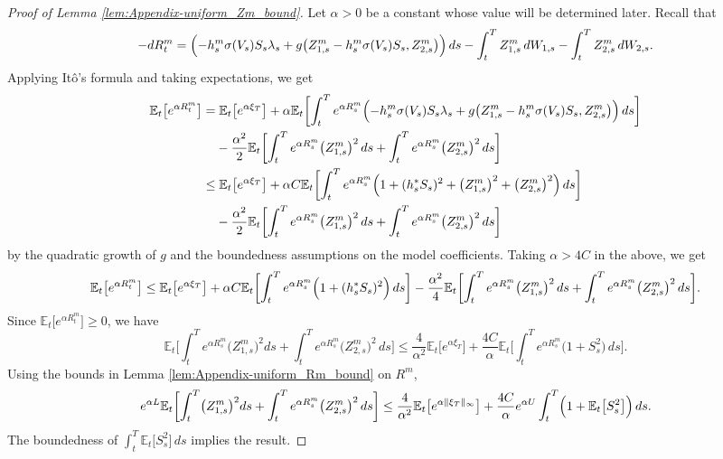 \documentclass{article}
\newcommand{\E}{\mathbb{E}}
\begin{document}
\begin{proof}[Proof of Lemma \ref{lem:Appendix-uniform_Zm_bound}]
Let $\alpha>0$ be a constant whose value will be determined later. Recall that
\[
	-dR^m_t= \Bigl(-h^m_s\sigma(V_s)S_s\lambda_s+ g\bigl(Z_{1,s}^m-h^m_s\sigma(V_s)S_s, Z_{2,s}^m\bigr)\Bigr) \, ds -\int_t^T Z^m_{1,s} \, dW_{1,s} -\int_t^T Z^m_{2,s}\, dW_{2,s}.
\]
Applying It\^o's formula and taking expectations, we get
\begin{align*}
	\E_t\bigl[e^{\alpha R_t^m}\bigr] &= \E_t \bigl[e^{\alpha \xi_T}\bigr]+\alpha \E_t \biggl[\int_t^Te^{\alpha R^m_s}\Bigl(-h^m_s\sigma(V_s)S_s\lambda_s+ g\bigl(Z_{1,s}^m-h^m_s\sigma(V_s)S_s, Z_{2,s}^m\bigr)\Bigr) \, ds\biggr]\\
	&\phantom{=:} -\frac{\alpha^2}{2} \E_t \biggl[\int_t^T e^{\alpha R^m_s} \bigl(Z^m_{1,s}\bigr)^2 \, ds +\int_t^T e^{\alpha R^m_s} \bigl(Z^m_{2,s}\bigr)^2 \, ds\biggr] \\
	&\leq  \E_t \bigl[e^{\alpha \xi_T}\bigr]+\alpha C \E_t \biggl[ \int_t^Te^{\alpha R^m_s}\Bigl(1+ (h^*_sS_s)^2 +\bigl(Z^m_{1,s}\bigr)^2+\bigl(Z^m_{2,s}\bigr)^2\Bigr) \, ds \biggr]\\
	&\phantom{=:} -\frac{\alpha^2}{2} \E_t\biggl[\int_t^T e^{\alpha R^m_s} \bigl(Z^m_{1,s}\bigr)^2 \, ds +\int_t^T e^{\alpha R^m_s} \bigl(Z^m_{2,s}\bigr)^2 \, ds\biggr] 
\end{align*}
by the quadratic growth of $g$ and the boundedness assumptions on the model coefficients. Taking $\alpha>4C$ in the above, we get
\[
	\E_t\bigl[e^{\alpha R_t^m}\bigr] \leq  \E_t \bigl[e^{\alpha \xi_T}\bigr]+\alpha C \E_t \biggl[\int_t^Te^{\alpha R^m_s}\Bigl(1+ (h_s^*S_s)^2\Bigr) \, ds\biggr] - \frac{\alpha^2}{4}\E_t \biggl[\int_t^T e^{\alpha R^m_s} \bigl(Z^m_{1,s}\bigr)^2 \, ds +\int_t^T e^{\alpha R^m_s} \bigl(Z^m_{2,s}\bigr)^2 \, ds\biggr].
\]
Since $\E_t\bigl[e^{\alpha R_t^m}\bigr] \geq 0$, we have
\[
	\E_t\biggl[\int_t^T e^{\alpha R^m_s} \bigl(Z^m_{1,s}\bigr)^2ds +\int_t^T e^{\alpha R^m_s} \bigl(Z^m_{2,s}\bigr)^2 \, ds\biggr] \leq \frac{4}{\alpha^2} \E_t \bigl[e^{\alpha \xi_T}\bigr] + \frac{4C}{\alpha} \E_t \biggl[ \int_t^Te^{\alpha R^m_s}\bigl(1+ S_s^2\bigr) \, ds \biggr].
\]
Using the bounds in Lemma \ref{lem:Appendix-uniform_Rm_bound} on $R^m$, 
\[
	e^{\alpha L} \E_t\biggl[\int_t^T  \bigl(Z^m_{1,s}\bigr)^2ds +\int_t^T e^{\alpha R^m_s} \bigl(Z^m_{2,s}\bigr)^2 \, ds\biggr] \leq \frac{4}{\alpha^2} \E_t \bigl[e^{\alpha \Vert \xi_T\Vert_\infty}\bigr] + \frac{4C}{\alpha} e^{\alpha U}\int_t^T\Bigl(1+ \E_t\bigl[S_s^2\bigr]\Bigr) \, ds.
\]
The boundedness of $\int_t^T \E_t \bigl[S_s^2\bigr] \, ds$ implies the result.
\end{proof}
\end{document}
